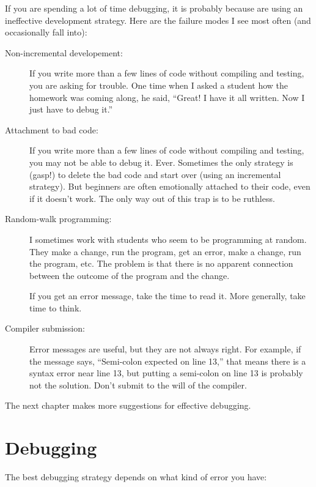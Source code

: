 \documentclass[12pt]{book}
\theoremstyle{definition}
\begin{document}
If you are spending a lot of time debugging, it is probably
because are using an ineffective development strategy.  Here
are the failure modes I see most often (and occasionally fall
into):

\begin{description}

\item[Non-incremental developement:] If you write more than a few
  lines of code without compiling and testing, you are asking for
  trouble.  One time when I asked a student how the homework was
  coming along, he said, ``Great!  I have it all written.  Now I just
  have to debug it.''

\item[Attachment to bad code:] If you write more than a few lines of
  code without compiling and testing, you may not be able to debug it.
  Ever.  Sometimes the only strategy is (gasp!)  to delete the bad
  code and start over (using an incremental strategy).  But beginners
  are often emotionally attached to their code, even if it doesn't
  work.  The only way out of this trap is to be ruthless.

\item[Random-walk programming:] I sometimes work with students who
  seem to be programming at random.  They make a change, run the
  program, get an error, make a change, run the program, etc.  The
  problem is that there is no apparent connection between the outcome
  of the program and the change.

  If you get an error message, take the time to read it.
  More generally, take time to think.

\item[Compiler submission:] Error messages are useful, but they
  are not always right.  For example, if the message says, ``Semi-colon
  expected on line 13,'' that means there is a syntax error near
  line 13, but putting a semi-colon on line 13 is probably not the
  solution.  Don't submit to the will of the compiler.

\end{description}

The next chapter makes more suggestions for effective debugging.


\chapter{Debugging}
\label{debug}

The best debugging strategy depends on what kind of error
you have:
\end{document}
